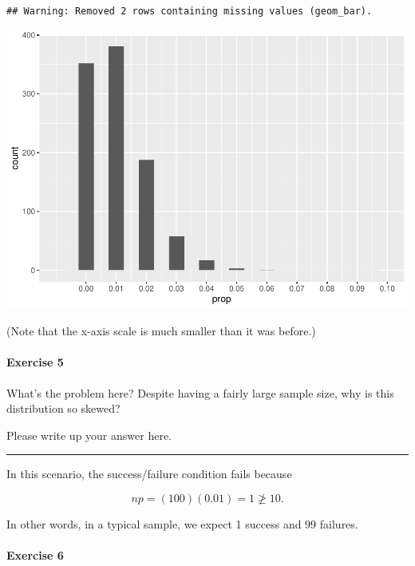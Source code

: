 \documentclass[
]{book}
\begin{document}
\begin{verbatim}
## Warning: Removed 2 rows containing missing values (geom_bar).
\end{verbatim}

\includegraphics{intro_stats_files/figure-latex/unnamed-chunk-374-1.pdf}

(Note that the x-axis scale is much smaller than it was before.)

\hypertarget{exercise-5-6}{%
\paragraph*{Exercise 5}\label{exercise-5-6}}

What's the problem here? Despite having a fairly large sample size, why is this distribution so skewed?

Please write up your answer here.

\begin{center}\rule{0.5\linewidth}{0.5pt}\end{center}

In this scenario, the success/failure condition fails because

\[
np = (100)(0.01) = 1 \ngeq 10.
\]

In other words, in a typical sample, we expect 1 success and 99 failures.

\hypertarget{exercise-6-4}{%
\paragraph*{Exercise 6}\label{exercise-6-4}}
\end{document}
